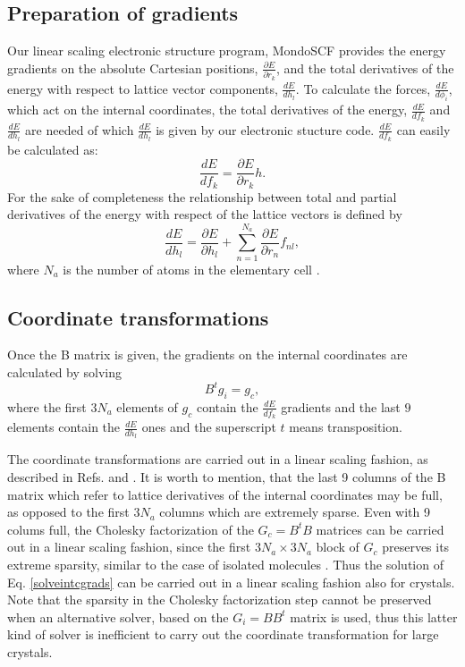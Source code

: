 \documentclass[prl,aps,preprint,superbib,12pt]{revtex4}
\begin{document}
\subsection{Preparation of gradients}
Our linear scaling electronic structure program, MondoSCF \cite{MondoSCF} provides
the energy gradients on the absolute Cartesian positions, 
$\frac{\partial E}{\partial r_{k}}$, and the total derivatives
of the energy with respect to lattice vector components, 
$\frac{d E}{d h_{l}}$.
To calculate the forces, $\frac{d E}{d \phi_{i}}$, which act on the
internal coordinates, the total derivatives of the energy,
$\frac{d E}{d f_{k}}$ and 
$\frac{d E}{d h_{l}}$ are needed of which $\frac{d E}{d h_{l}}$ is 
given by our electronic stucture code.
$\frac{d E}{d f_{k}}$ can easily be calculated as:
\begin{equation}
\frac{d E}{d f_{k}} = \frac{\partial E}{\partial r_{k}} h .
\end{equation}
For the sake of completeness the relationship between total and
partial derivatives of the energy with respect of the lattice vectors
is defined by
\begin{equation}
\frac{d E}{d h_{l}} = \frac{\partial E}{\partial h_{l}} +
                      \sum_{n=1}^{N_{a}} 
                      \frac{\partial E}{\partial r_{n}} f_{nl} ,
\end{equation}
where $N_{a}$ is the number of atoms in the elementary cell 
\cite{TBucko05}.



\subsection{Coordinate transformations}
Once the B matrix is given, the gradients on the internal coordinates
are calculated by solving 
\begin{equation} \label{solveintcgrads}
B^{t} g_{i} = g_{c} ,
\end{equation}
where the first $3N_{a}$ elements of $g_{c}$ contain 
the $\frac{d E}{d f_{k}}$ gradients and the last $9$ elements contain
the $\frac{d E}{d h_{l}}$ ones and the superscript $t$ means 
transposition.

The coordinate transformations are carried out in a linear scaling 
fashion, as described in Refs.  and 
. It is worth to mention, that the last 9 columns
of the B matrix which refer to lattice derivatives of the internal 
coordinates may be full, as opposed to the first $3N_{a}$ columns 
which are extremely sparse. Even with 9 colums full, the Cholesky
factorization of the $G_{c}=B^{t}B$ matrices can be carried out
in a linear scaling fashion, since the first $3N_{a} \times 3N_{a}$
block of $G_{c}$ preserves its extreme sparsity, similar to the
case of isolated molecules \cite{KNemeth00}.
Thus the solution of Eq. \ref{solveintcgrads} can be carried out 
in a linear scaling fashion also for crystals.
Note that the sparsity in the Cholesky factorization step cannot be
preserved when an alternative solver, based on the $G_{i}=BB^{t}$
matrix is used, thus this latter kind of solver 
is inefficient to carry out
the coordinate transformation for large crystals.
\end{document}

